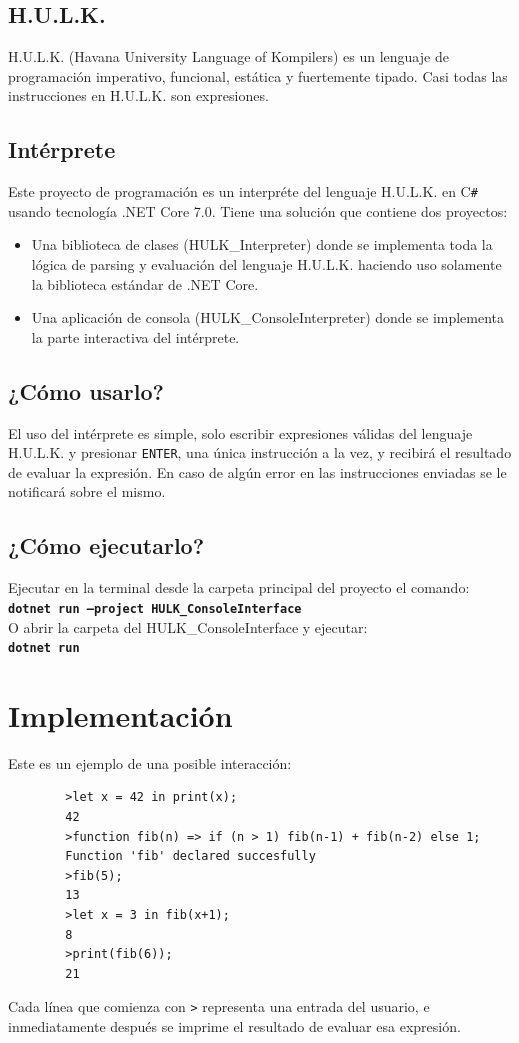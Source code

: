 \documentclass[12pt,a4paper]{article}
\begin{document}
\subsection{H.U.L.K.}\label{sub:hulk}
H.U.L.K. (Havana University Language of Kompilers) es un lenguaje de programación imperativo, funcional, estática y fuertemente tipado. Casi todas las instrucciones en H.U.L.K. son expresiones.
\subsection{Intérprete}\label{sub:interpreter}
Este proyecto de programación es un interpréte del lenguaje H.U.L.K. en C\texttt{\#} usando tecnología .NET Core 7.0. Tiene una solución que contiene dos proyectos:
\begin{itemize}
	\item Una biblioteca de clases (HULK\_Interpreter) donde se implementa toda la lógica de parsing y evaluación del lenguaje H.U.L.K. haciendo uso solamente la biblioteca estándar de .NET Core.
	\item Una aplicación de consola (HULK\_ConsoleInterpreter) donde se implementa la parte interactiva del intérprete.
\end{itemize}
\subsection{¿Cómo usarlo?}\label{sub:use}
	El uso del intérprete es simple, solo escribir expresiones válidas del lenguaje H.U.L.K. y presionar \texttt{ENTER}, una única instrucción a la vez, y recibirá el resultado de evaluar la expresión. En caso de algún error en las instrucciones enviadas se le notificará sobre el mismo.
\subsection{¿Cómo ejecutarlo?}\label{sub:execute}
Ejecutar en la terminal desde la carpeta principal del proyecto el comando:\\
\texttt{\bf dotnet run --project HULK\_ConsoleInterface}\\
O abrir la carpeta del HULK\_ConsoleInterface y ejecutar:\\ \texttt{\bf dotnet run} 



\section{Implementación}\label{sub:impl}
Este es un ejemplo de una posible interacción:
	\begin{verbatim}
		>let x = 42 in print(x);
		42
		>function fib(n) => if (n > 1) fib(n-1) + fib(n-2) else 1;
		Function 'fib' declared succesfully
		>fib(5);
		13
		>let x = 3 in fib(x+1);
		8
		>print(fib(6));
		21
	\end{verbatim}
Cada línea que comienza con \texttt{>} representa una entrada del usuario, e inmediatamente después se imprime el resultado de evaluar esa expresión.
\end{document}
